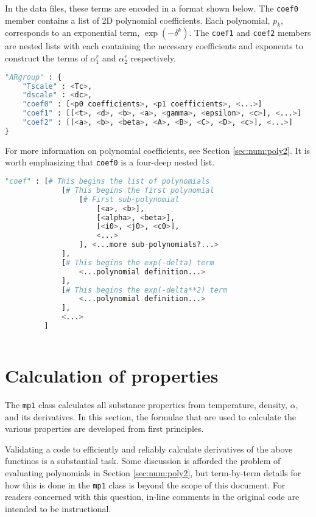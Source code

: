 In the data files, these terms are encoded in a format shown below.  The \texttt{coef0} member contains a list of 2D polynomial coefficients.  Each polynomial, $p_k$, corresponds to an exponential term, $\exp(-\delta^k)$.  The \texttt{coef1} and \texttt{coef2} members are nested lists with each containing the necessary coefficients and exponents to construct the terms of $\alpha^r_1$ and $\alpha^r_2$ respectively.  
\begin{lstlisting}[language=Python]
"ARgroup" : {
    "Tscale" : <Tc>,
    "dscale" : <dc>,
    "coef0" : [<p0 coefficients>, <p1 coefficients>, <...>]
    "coef1" : [[<t>, <d>, <b>, <a>, <gamma>, <epsilon>, <c>], <...>]
    "coef2" : [[<a>, <b>, <beta>, <A>, <B>, <C>, <D>, <c>], <...>]
}
\end{lstlisting}

For more information on polynomial coefficients, see Section \ref{sec:num:poly2}.  It is worth emphasizing that \texttt{coef0} is a four-deep nested list.
\begin{lstlisting}[language=Python]
"coef" : [# This begins the list of polynomials
             [# This begins the first polynomial
                 [# First sub-polynomial
                     [<a>, <b>],
                     [<alpha>, <beta>],
                     [<i0>, <j0>, <c0>],
                     <...>
                 ], <...more sub-polynomials?...>
             ],
             [# This begins the exp(-delta) term
                 <...polynomial definition...>
             ],
             [# This begins the exp(-delta**2) term
                 <...polynomial definition...>
             ],
             <...>
         ]
             
\end{lstlisting}


\section{Calculation of properties}\label{sec:mp1:properties}

The \texttt{mp1} class calculates all substance properties from temperature, density, $\alpha$, and its derivatives.  In this section, the formulae that are used to calculate the various properties are developed from first principles.

Validating a code to efficiently and reliably calculate derivatives of the above functinos is a substantial task.  Some discussion is afforded the problem of evaluating polynomials in Section \ref{sec:num:poly2}, but term-by-term details for how this is done in the \texttt{mp1} class is beyond the scope of this document.  For readers concerned with this question, in-line comments in the original code are intended to be instructional.

